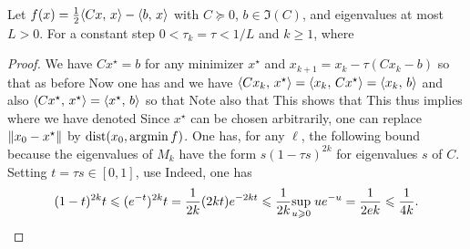 \begin{prop}\label{prop-graddesc-quad-sublin}
	Let $f(x)=\frac12\langle Cx,\,x\rangle-\langle b,\,x\rangle$ with $C\succeq0$, $b\in\Im(C)$, and eigenvalues at most $L>0$. For a constant step $0<\tau_k=\tau<1/L$ and $k\geq1$,
	where 
\end{prop}
\begin{proof}	
	We have $C x^\star=b$ for any minimizer $x^\star$
	and $x_{k+1}=x_k-\tau (C x_k-b)$ so that as before
	Now one has
	and we have $\langle Cx_k,\,x^\star\rangle = \langle x_k,\,Cx^\star\rangle = \langle x_k,\,b\rangle$
	and also $\langle Cx^\star,\,x^\star\rangle = \langle x^\star,\,b\rangle$ so that
	Note also that 
	This shows that 
	This thus implies 
	where we have denoted
	Since $x^\star$ can be chosen arbitrarily, one can replace $\lVert x_0-x^\star\rVert$ by $\text{\upshape dist}(x_0,\operatorname{argmin} f)$.
	One has, for any $\ell$, the following bound 
	because the eigenvalues of $M_k$ have the form $s(1-\tau s)^{2k}$ for eigenvalues $s$ of $C$. Setting $t=\tau s\in[0,1]$, use
	Indeed, one has
	\begin{align*}
		(1-t)^{2k} t \leqslant (e^{-t})^{2k}t
		= \frac{1}{2k} (2kt) e^{-2k t}
		\leqslant \frac{1}{2k} \underset{u \geqslant 0}{\sup}\; u e^{-u}
		= \frac{1}{2e k} \leqslant \frac{1}{4k}.
	\end{align*}
\end{proof}	
	



